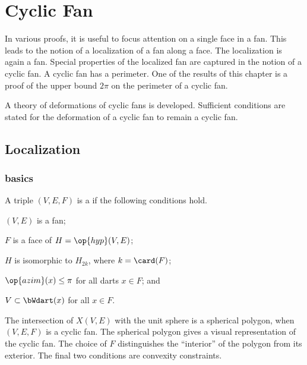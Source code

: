 %
\chapter{Cyclic Fan}\label{sec:cyclic}


\begin{summary}
In various proofs, it is useful to focus attention on a single face
in a fan.  This leads to the notion of a localization of a fan along
a face.  The localization is again a fan.  Special properties of the
localized fan are captured in the notion of a cyclic fan.  A cyclic
fan has a perimeter.  One of the results of this chapter is a proof
of the upper bound $2\pi$ on the perimeter of a cyclic fan.

A theory of deformations of cyclic fans is developed.  Sufficient
conditions are stated for the deformation of a cyclic fan to remain
a cyclic fan.
\end{summary}


\section{Localization}


\subsection{basics}


\begin{definition} A triple $(V,E,F)$ is a  if the following conditions hold.
\begin{nomerate} 
\item {} $(V,E)$ is a fan;
\item {} $F$ is a face of $H = \op{hyp}(V,E)$;
\item {} $H$ is isomorphic to $H_{2k}$, where $k =
\card(F)$;
\item {} $\op{azim}(x)\le \pi$ for all darts $x\in F$; and
\item {} $V\subset \bWdart(x)$ for all $x\in F$.
\end{nomerate}
\end{definition}
%

\begin{remark}[visualization]
The intersection of $X(V,E)$ with the unit sphere is a spherical
polygon, when $(V,E,F)$ is a cyclic fan.  The spherical polygon gives
a visual representation of the cyclic fan. The choice of $F$
distinguishes the ``interior'' of the polygon from its exterior.  The
final two conditions are convexity constraints.
\end{remark}

